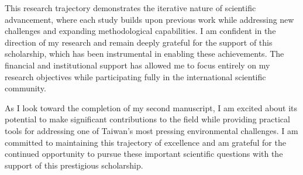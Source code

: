 \documentclass[12pt, a4paper]{article}
\begin{document}
	This research trajectory demonstrates the iterative nature of scientific advancement, where each study builds upon previous work while addressing new challenges and expanding methodological capabilities. I am confident in the direction of my research and remain deeply grateful for the support of this scholarship, which has been instrumental in enabling these achievements. The financial and institutional support has allowed me to focus entirely on my research objectives while participating fully in the international scientific community.
	
	As I look toward the completion of my second manuscript, I am excited about its potential to make significant contributions to the field while providing practical tools for addressing one of Taiwan's most pressing environmental challenges. I am committed to maintaining this trajectory of excellence and am grateful for the continued opportunity to pursue these important scientific questions with the support of this prestigious scholarship.
	
\end{document}
